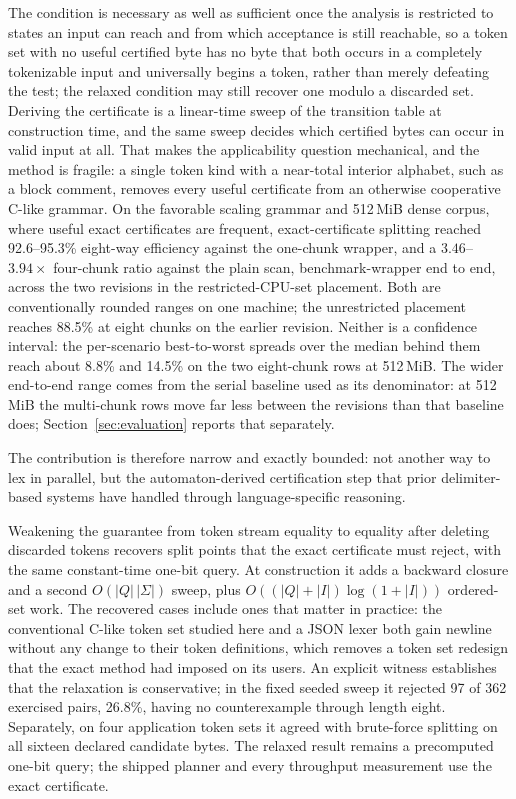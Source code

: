 \documentclass[11pt,a4paper]{article}
\theoremstyle{definition}
\theoremstyle{plain}
\begin{document}
The condition is necessary as well as sufficient once the analysis is restricted to states an input can reach and from
which acceptance is still reachable, so a token set with no useful certified byte has no byte that both occurs in a
completely tokenizable input and universally begins a token, rather than merely defeating the test; the relaxed
condition may still recover one modulo a discarded set. Deriving the certificate is a linear-time sweep of the
transition table at construction time, and the same sweep decides which certified bytes can occur in valid input at
all. That makes the applicability question mechanical, and the method is fragile: a single token kind with a
near-total interior alphabet, such as a block comment, removes every useful certificate from an otherwise cooperative
C-like grammar. On the favorable scaling grammar and 512\,MiB dense corpus, where useful exact certificates are
frequent, exact-certificate splitting reached 92.6--95.3\% eight-way efficiency against the one-chunk wrapper, and a
$3.46$--$3.94\times$ four-chunk ratio against the plain scan, benchmark-wrapper end to end, across the two revisions
in the restricted-CPU-set placement. Both are conventionally rounded ranges on one machine; the unrestricted placement
reaches 88.5\% at eight chunks on the earlier revision. Neither is a confidence interval: the per-scenario
best-to-worst spreads over the median behind them reach about 8.8\% and 14.5\% on the two eight-chunk rows at
512\,MiB. The wider end-to-end range comes from the serial baseline used as its denominator: at 512\,MiB the
multi-chunk rows move far less between the revisions than that baseline does; Section~\ref{sec:evaluation} reports
that separately.

The contribution is therefore narrow and exactly bounded: not another way to lex in parallel, but the
automaton-derived certification step that prior delimiter-based systems have handled through language-specific
reasoning.

Weakening the guarantee from token stream equality to equality after deleting discarded tokens recovers split points
that the exact certificate must reject, with the same constant-time one-bit query. At construction it adds a backward
closure and a second $O(|Q|\,|\Sigma|)$ sweep, plus $O((|Q|+|I|)\log(1+|I|))$ ordered-set work. The recovered cases
include ones that matter in practice: the conventional C-like token set studied here and a JSON lexer both gain
newline without any change to their token definitions, which removes a token set redesign that the exact method had
imposed on its users. An explicit witness establishes that the relaxation is conservative; in the fixed seeded sweep
it rejected 97 of 362 exercised pairs, 26.8\%, having no counterexample through length eight. Separately, on four
application token sets it agreed with brute-force splitting on all sixteen declared candidate bytes. The relaxed
result remains a precomputed one-bit query; the shipped planner and every throughput measurement use the exact
certificate.
\end{document}
